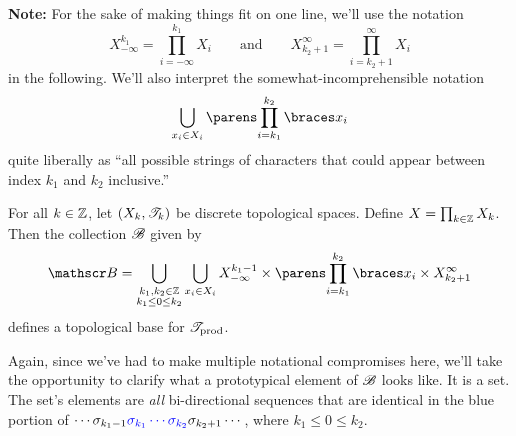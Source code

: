 \documentclass{fkpaper}
\begin{document}
\begin{multicols}{2}
  \textbf{Note:} For the sake of making things fit on one line, we'll
  use the notation
  \[
    X_{-\infty}^{k_1} = \prod_{i=-\infty}^{k_1}X_i
    \qquad\text{and}\qquad
    X_{k_2+1}^{\infty} = \prod_{i=k_2+1}^{\infty}X_i
  \]
  in the following. We'll also interpret the somewhat-incomprehensible
  notation
  \[
    \bigcup_{x_i \in X_i} \pn{\prod_{i = k_1}^{k_2} \set{x_i}}
  \]
  quite liberally as ``all possible strings of characters that could
  appear between index $k_1$ and $k_2$ inclusive.''
  \begin{proposition}\label{prop:prefix-basis}
    For all $k \in \mathbb{Z}$, let $(X_k, {\mathscr{T}}_k)$ be discrete topological
    spaces. Define $X = \prod_{k\in\mathbb{Z}} X_k$. %
    Then the collection ${\mathscr{B}}$ given by
    \[
      \ms B = \bigcup_{\substack{k_1, k_2 \in \ZZ \\ k_1 \leq 0 \leq k_2}}
      \bigcup_{x_i \in X_i} X_{-\infty}^{k_1-1} \times
      \pn{\prod_{i = k_1}^{k_2} \set{x_i}}
      \times X_{k_2+1}^\infty
    \]
    defines a topological base for ${\mathscr{T}}_{\rm prod}$.
  \end{proposition}
  Again, since we've had to make multiple notational compromises here,
  we'll take the opportunity to clarify what a prototypical element of
  ${\mathscr{B}}$ looks like. It is a set. The set's elements are \emph{all}
  bi-directional sequences that are identical in the {\color{blue}
    blue} portion of $\cdots \sigma_{k_1-1} {\color{blue} \sigma_{k_1}
    \cdots \sigma_{k_2}} \sigma_{k_2+1} \cdots$, where $k_1 \leq 0
  \leq k_2$.


\end{multicols}
\end{document}
